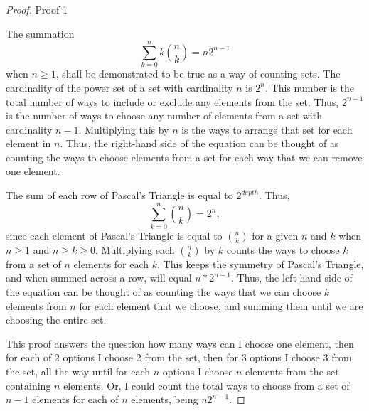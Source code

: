 \documentclass[11pt,titlepage]{article}		%
\theoremstyle{theorem}
\begin{document}
\begin{proof}
Proof 1

The summation 
    \[
        \sum\limits_{k=0}^n k \binom{n}{k} = n 2^{n-1}
    \]
when $n\ge 1$, shall be demonstrated to be true as a way of counting sets. The cardinality of the power set of a set with cardinality $n$ is $2^n$. This number is the total number of ways to include or exclude any elements from the set. Thus, $2^{n-1}$ is the number of ways to choose any number of elements from a set with cardinality $n-1$. Multiplying this by $n$ is the ways to arrange that set for each element in $n$. Thus, the right-hand side of the equation can be thought of as counting the ways to choose elements from a set for each way that we can remove one element.

The sum of each row of Pascal's Triangle is equal to $2^{depth}$. Thus, 
    \[
        \sum\limits_{k=0}^n \binom{n}{k} = 2^{n},
    \]
since each element of Pascal's Triangle is equal to $\binom{n}{k}$ for a given $n$ and $k$ when $n \ge 1$ and $n \ge k \ge 0$. Multiplying each $\binom{n}{k}$ by $k$ counts the ways to choose $k$ from a set of $n$ elements for each $k$. This keeps the symmetry of Pascal's Triangle, and when summed across a row, will equal $n*2^{n-1}$. Thus, the left-hand side of the equation can be thought of as counting the ways that we can choose $k$ elements from $n$ for each element that we choose, and summing them until we are choosing the entire set.

This proof answers the question how many ways can I choose one element, then for each of 2 options I choose 2 from the set, then for 3 options I choose 3 from the set, all the way until for each $n$ options I choose $n$ elements from the set containing $n$ elements. Or, I could count the total ways to choose from a set of $n-1$ elements for each of $n$ elements, being $n2^{n-1}$.
\end{proof}
\clearpage
\end{document}

